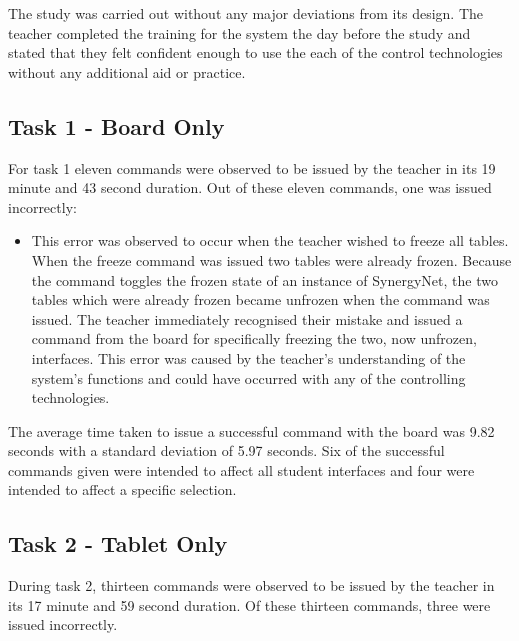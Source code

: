 \documentclass[manuscript, review, screen]{acmart}
\begin{document}
The study was carried out without any major deviations from its design.
The teacher completed the training for the system the day before the study and stated that they felt confident enough to use the each of the control technologies without any additional aid or practice.

\subsection{Task 1 - Board Only}
\label{sec:results:task1}  

For task 1 eleven commands were observed to be issued by the teacher in its 19 minute and 43 second duration.
Out of these eleven commands, one was issued incorrectly:

\begin{itemize}
\item This error was observed to occur when the teacher wished to freeze all tables.
When the freeze command was issued two tables were already frozen.
Because the command toggles the frozen state of an instance of SynergyNet, the two tables which were already frozen became unfrozen when the command was issued.
The teacher immediately recognised their mistake and issued a command from the board for specifically freezing the two, now unfrozen, interfaces.
This error was caused by the teacher's understanding of the system's functions and could have occurred with any of the controlling technologies.
\end{itemize}


The average time taken to issue a successful command with the board was 9.82 seconds with a standard deviation of 5.97 seconds.
Six of the successful commands given were intended to affect all student interfaces and four were intended to affect a specific selection.

\subsection{Task 2 - Tablet Only}
\label{sec:results:task2}  

During task 2, thirteen commands were observed to be issued by the teacher in its 17 minute and 59 second duration.
Of these thirteen commands, three were issued incorrectly.
\end{document}

